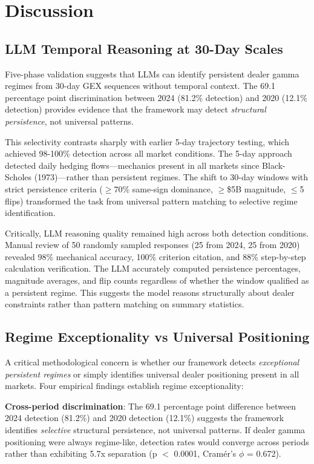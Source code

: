 \section{Discussion}

\subsection{LLM Temporal Reasoning at 30-Day Scales}

Five-phase validation suggests that LLMs can identify persistent dealer gamma regimes from 30-day GEX sequences without temporal context. The 69.1 percentage point discrimination between 2024 (81.2\% detection) and 2020 (12.1\% detection) provides evidence that the framework may detect \textit{structural persistence}, not universal patterns.

This selectivity contrasts sharply with earlier 5-day trajectory testing, which achieved 98-100\% detection across all market conditions. The 5-day approach detected daily hedging flows—mechanics present in all markets since Black-Scholes (1973)—rather than persistent regimes. The shift to 30-day windows with strict persistence criteria ($\geq$70\% same-sign dominance, $\geq$\$5B magnitude, $\leq$5 flips) transformed the task from universal pattern matching to selective regime identification.

Critically, LLM reasoning quality remained high across both detection conditions. Manual review of 50 randomly sampled responses (25 from 2024, 25 from 2020) revealed 98\% mechanical accuracy, 100\% criterion citation, and 88\% step-by-step calculation verification. The LLM accurately computed persistence percentages, magnitude averages, and flip counts regardless of whether the window qualified as a persistent regime. This suggests the model reasons structurally about dealer constraints rather than pattern matching on summary statistics.

\subsection{Regime Exceptionality vs Universal Positioning}

A critical methodological concern is whether our framework detects \textit{exceptional persistent regimes} or simply identifies universal dealer positioning present in all markets. Four empirical findings establish regime exceptionality:

\textbf{Cross-period discrimination}: The 69.1 percentage point difference between 2024 detection (81.2\%) and 2020 detection (12.1\%) suggests the framework identifies \textit{selective} structural persistence, not universal patterns. If dealer gamma positioning were always regime-like, detection rates would converge across periods rather than exhibiting 5.7x separation (p $<$ 0.0001, Cram\'er's $\phi$ = 0.672).

